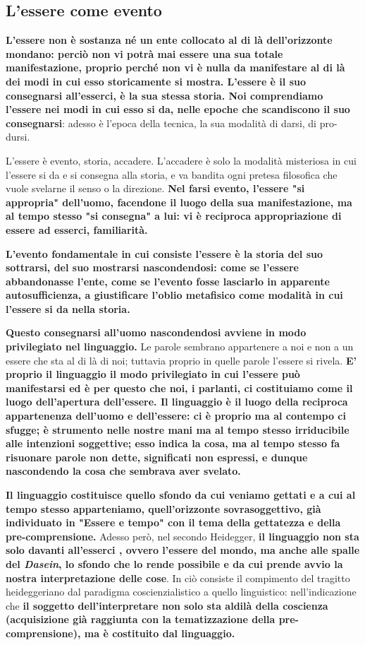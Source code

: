 \subsection{L'essere come evento}


\textbf{L'essere non è sostanza né un ente collocato al di
là dell'orizzonte mondano: perciò non vi potrà
mai essere una sua totale manifestazione, proprio perché
non vi è nulla da manifestare al di là dei modi
in cui esso storicamente si mostra.
L'essere è il suo consegnarsi all'esserci, è
la sua stessa storia. Noi comprendiamo l'essere nei
modi in cui esso si da, nelle epoche che scandiscono il
suo consegnarsi}: adesso è l'epoca della tecnica, la
sua modalità di darsi, di pro-dursi.

L'essere è evento, storia, accadere. L'accadere è
solo la modalità misteriosa in cui l'essere si da e si
consegna alla storia, e va bandita ogni pretesa
filosofica che vuole svelarne il senso o la direzione.
\textbf{Nel farsi evento, l'essere "si appropria" dell'uomo,
facendone il luogo della sua manifestazione,
ma al tempo stesso "si consegna" a lui: vi è
reciproca appropriazione di essere ad esserci,
familiarità.}

\textbf{L'evento fondamentale in cui consiste l'essere è la
storia del suo sottrarsi, del suo mostrarsi nascondendosi:
come se l'essere abbandonasse l'ente, come se
l'evento fosse lasciarlo in apparente autosufficienza,
a giustificare l'oblio metafisico come modalità
in cui l'essere si da nella storia.}

\textbf{Questo consegnarsi all'uomo nascondendosi avviene in modo privilegiato
nel linguaggio.}
Le parole sembrano appartenere a noi e non a un
essere che sta al di là di noi; tuttavia proprio in
quelle parole l'essere si rivela.\textbf{ E' proprio il linguaggio
il modo privilegiato in cui l'essere può manifestarsi
ed è per questo che noi, i parlanti, ci
costituiamo come il luogo dell'apertura
dell'essere.
Il linguaggio è il luogo della reciproca appartenenza dell'uomo e dell'essere: ci è proprio ma
al contempo ci sfugge; è strumento nelle
nostre mani ma al tempo stesso irriducibile alle
intenzioni soggettive; esso indica la cosa, ma
al tempo stesso fa risuonare parole non dette,
significati non espressi, e dunque nascondendo
la cosa che sembrava aver svelato.}

\textbf{Il linguaggio costituisce quello sfondo da cui
veniamo gettati e a cui al tempo stesso
apparteniamo, quell'orizzonte sovrasoggettivo,
già individuato in "Essere e tempo" con
il tema della gettatezza e della 
pre-comprensione.}
Adesso però, nel secondo Heidegger, \textbf{il linguaggio
non sta solo davanti all'esserci , ovvero
l'essere del mondo, ma anche alle spalle del
\textit{Dasein}, lo sfondo che lo rende possibile e da cui
prende avvio la nostra interpretazione delle cose}.
In ciò consiste il compimento del tragitto
heideggeriano dal paradigma coscienzialistico a quello
linguistico: nell'indicazione che \textbf{il soggetto dell'interpretare non solo sta aldilà della
coscienza (acquisizione già raggiunta con la
tematizzazione della pre-comprensione), ma
è costituito dal linguaggio.}


